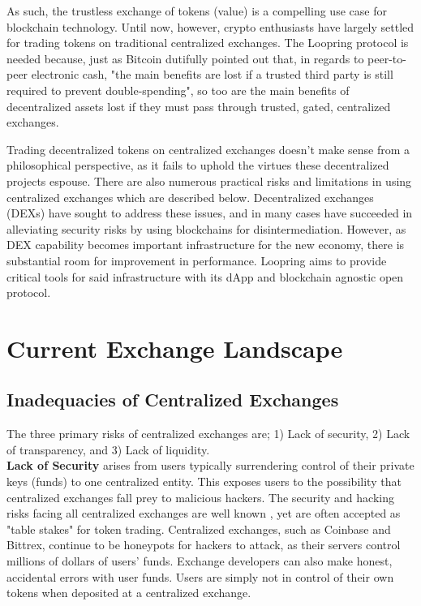 \documentclass[UTF8,nofonts]{article}
\begin{document}
As such, the trustless exchange of tokens (value) is a compelling use case for blockchain technology. Until now, however, crypto enthusiasts have largely settled for trading tokens on traditional centralized exchanges. The Loopring protocol is needed because, just as Bitcoin \cite{nakamoto2008bitcoin} dutifully pointed out that, in regards to peer-to-peer electronic cash, "the main benefits are lost if a trusted third party is still required to prevent double-spending", so too are the main benefits of decentralized assets lost if they must pass through trusted, gated, centralized exchanges.

Trading decentralized tokens on centralized exchanges doesn't make sense from a philosophical perspective, as it fails to uphold the virtues these decentralized projects espouse. There are also numerous practical risks and limitations in using centralized exchanges which are described below. Decentralized exchanges (DEXs) \cite{schuh2015bitshares} \cite{bancor} \cite{kyber} \cite{warren20170x} have sought to address these issues, and in many cases have succeeded in alleviating security risks by using blockchains for disintermediation. However, as DEX capability becomes important infrastructure for the new economy, there is substantial room for improvement in performance. Loopring aims to provide critical tools for said infrastructure with its dApp and blockchain agnostic open protocol. 

\section{Current Exchange Landscape\label{sec:current_exchange_landscape}}

\subsection{Inadequacies of Centralized Exchanges}
The three primary risks of centralized exchanges are; 1) Lack of security, 2) Lack of transparency, and 3) Lack of liquidity.\\

\textbf{Lack of Security} arises from users typically surrendering control of their private keys (funds) to one centralized entity. This exposes users to the possibility that centralized exchanges fall prey to malicious hackers. The security and hacking risks facing all centralized exchanges are well known \cite{coincheckhack} \cite{mtgox} \cite{mcmillan2014inside}, yet are often accepted as "table stakes" for token trading. Centralized exchanges, such as Coinbase and Bittrex, continue to be honeypots for hackers to attack, as their servers control millions of dollars of users' funds. Exchange developers can also make honest, accidental errors with user funds. Users are simply not in control of their own tokens when deposited at a centralized exchange.\\
\end{document}
